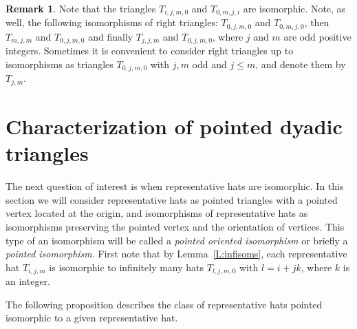\documentclass[12pt]{amsart}
\theoremstyle{plain}
\theoremstyle{definition}
\newtheorem{remark}[theorem]{Remark}
\numberwithin{equation}{section}
\begin{document}
\begin{remark}\label{R:rightrepr}
Note that the triangles $T_{i,j,m,0}$ and $T_{0,m,j,i}$ are isomorphic. Note, as well, the
following isomorphisms of right triangles: $T_{0,j,m,0}$ and $T_{0,m,j,0}$, then $T_{m,j,m}$ and $T_{0,j,m,0}$ and finally $T_{j,j,m}$ and $T_{0,j,m,0}$, where $j$ and $m$ are odd positive integers. Sometimes it is convenient to consider right triangles up to isomorphisms as triangles $T_{0,j,m,0}$ with $j, m$ odd and $j \leq m$, and denote them by $T_{j,m}$.
\end{remark}


\section{Characterization of pointed dyadic triangles}\label{S:5}


The next question of interest is when representative hats are isomorphic. In this section
we will consider representative hats as pointed triangles with a pointed vertex located at the
origin, and isomorphisms of representative hats as isomorphisms preserving the pointed vertex
and the orientation of vertices. This type of an isomorphism will be called a \emph{pointed
oriented isomorphism} or briefly a \emph{pointed isomorphism}. First note that by
Lemma~\ref{L:infisoms}, each representative hat $T_{i,j,m}$ is isomorphic to infinitely many
hats $T_{l,j,m,0}$ with $l = i + jk$, where $k$ is an integer.


The following proposition describes the class of representative hats pointed isomorphic to a given representative hat.
\end{document}
